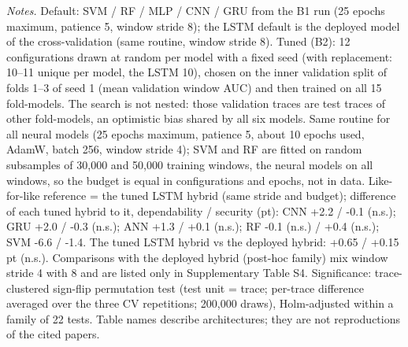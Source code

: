 \begin{table}[!htbp]
\vspace{3pt}\par\raggedright\scriptsize\textit{Notes.} Default: SVM / RF / MLP / CNN / GRU from the B1 run (25 epochs maximum, patience 5, window stride 8); the LSTM default is the deployed model of the cross-validation (same routine, window stride 8). Tuned (B2): 12 configurations drawn at random per model with a fixed seed (with replacement: 10--11 unique per model, the LSTM 10), chosen on the inner validation split of folds 1--3 of seed 1 (mean validation window AUC) and then trained on all 15 fold-models. The search is not nested: those validation traces are test traces of other fold-models, an optimistic bias shared by all six models. Same routine for all neural models (25 epochs maximum, patience 5, about 10 epochs used, AdamW, batch 256, window stride 4); SVM and RF are fitted on random subsamples of 30{,}000 and 50{,}000 training windows, the neural models on all windows, so the budget is equal in configurations and epochs, not in data. Like-for-like reference = the tuned LSTM hybrid (same stride and budget); difference of each tuned hybrid to it, dependability / security (pt): CNN +2.2 / -0.1 (n.s.); GRU +2.0 / -0.3 (n.s.); ANN +1.3 / +0.1 (n.s.); RF -0.1 (n.s.) / +0.4 (n.s.); SVM -6.6 / -1.4. The tuned LSTM hybrid vs the deployed hybrid: +0.65 / +0.15 pt (n.s.). Comparisons with the deployed hybrid (post-hoc family) mix window stride 4 with 8 and are listed only in Supplementary Table S4. Significance: trace-clustered sign-flip permutation test (test unit = trace; per-trace difference averaged over the three CV repetitions; 200{,}000 draws), Holm-adjusted within a family of 22 tests. Table names describe architectures; they are not reproductions of the cited papers.
\end{table}